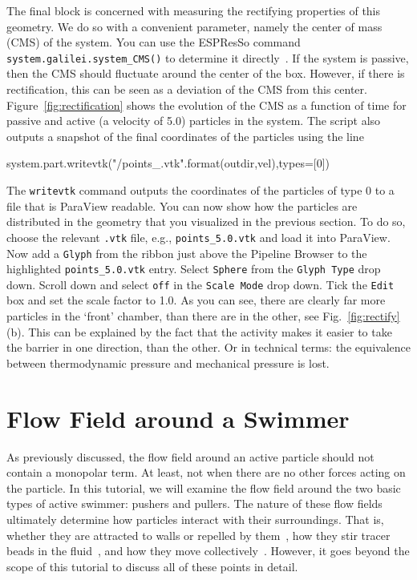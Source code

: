 \documentclass[aip,jcp,reprint,a4paper,onecolumn,amsmath]{revtex4-1}
\newcommand\code{\lstinline}
\newcommand{\es}{\mbox{\textsf{ESPResSo}}\xspace}
\newcommand\codees{\lstinline[language=python]}
\begin{document}
The final block is concerned with measuring the rectifying properties of this geometry. We do so with a convenient parameter, namely the center of mass (CMS) of the system. You can use the \es{} command \codees{system.galilei.system_CMS()} to determine it directly~\cite{UG}. If the system is passive, then the CMS should fluctuate around the center of the box. However, if there is rectification, this can be seen as a deviation of the CMS from this center. Figure~\ref{fig:rectification} shows the evolution of the CMS as a function of time for passive and active (a velocity of 5.0) particles in the system. The script also outputs a snapshot of the final coordinates of the particles using the line
\begin{espresso}
system.part.writevtk("{}/points_{}.vtk".format(outdir,vel),types=[0])
\end{espresso}
The \codees{writevtk} command outputs the coordinates of the particles of type 0 to a file that is ParaView readable. You can now show how the particles are distributed in the geometry that you visualized in the previous section. To do so, choose the relevant \code{.vtk} file, e.g., \code{points_5.0.vtk} and load it into ParaView. Now add a \code{Glyph} from the ribbon just above the Pipeline Browser to the highlighted \code{points_5.0.vtk} entry. Select \code{Sphere} from the \code{Glyph Type} drop down. Scroll down and select \code{off} in the \code{Scale Mode} drop down. Tick the \code{Edit} box and set the scale factor to 1.0. As you can see, there are clearly far more particles in the `front' chamber, than there are in the other, see Fig.~\ref{fig:rectify}(b). This can be explained by the fact that the activity makes it easier to take the barrier in one direction, than the other. Or in technical terms: the equivalence between thermodynamic pressure and mechanical pressure is lost.

\section{\label{sec:flow}Flow Field around a Swimmer}

As previously discussed, the flow field around an active particle should not contain a monopolar term. At least, not when there are no other forces acting on the particle. In this tutorial, we will examine the flow field around the two basic types of active swimmer: pushers and pullers. The nature of these flow fields ultimately determine how particles interact with their surroundings. That is, whether they are attracted to walls or repelled by them~\cite{Spagnolie_12}, how they stir tracer beads in the fluid~\cite{Morozov_14}, and how they move collectively~\cite{Zoettl_14}. However, it goes beyond the scope of this tutorial to discuss all of these points in detail.
\end{document}
